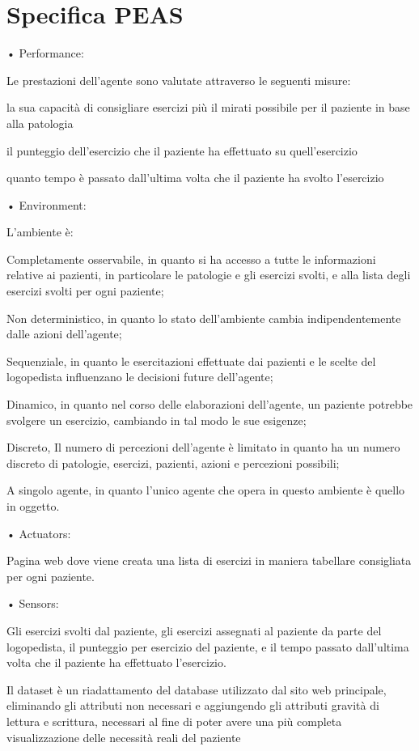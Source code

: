 \documentclass{article}
\begin{document}
    \section{Specifica PEAS}

    • Performance:

    Le prestazioni dell’agente sono valutate attraverso le seguenti misure:

    la sua capacità di consigliare esercizi più il mirati possibile per il paziente in base alla patologia

    il punteggio dell'esercizio che il paziente ha effettuato su quell'esercizio

    quanto tempo è passato dall'ultima volta che il paziente ha svolto l'esercizio

    • Environment:

    L’ambiente è:

    Completamente osservabile, in quanto si ha accesso a tutte le informazioni relative ai pazienti, in particolare le patologie e gli esercizi svolti, e
    alla lista degli esercizi svolti per ogni paziente;

    Non deterministico, in quanto lo stato dell’ambiente cambia indipendentemente dalle azioni dell’agente;

    Sequenziale, in quanto le esercitazioni effettuate dai pazienti e le scelte del logopedista influenzano le decisioni future dell’agente;

    Dinamico, in quanto nel corso delle elaborazioni dell’agente, un paziente potrebbe svolgere un esercizio, cambiando in tal modo le sue esigenze;

    Discreto, Il numero di percezioni dell’agente è limitato in quanto ha un numero discreto di patologie, esercizi, pazienti, azioni e percezioni possibili;

    A singolo agente, in quanto l’unico agente che opera in questo ambiente è quello in oggetto.

    • Actuators:

    Pagina web dove viene creata una lista di esercizi in maniera tabellare consigliata per ogni paziente.

    • Sensors:

    Gli esercizi svolti dal paziente, gli esercizi assegnati al paziente da parte del logopedista, il punteggio per esercizio del paziente, e il tempo passato
    dall'ultima volta che il paziente ha effettuato l'esercizio.

    Il dataset è un riadattamento del database utilizzato dal sito web principale, eliminando gli attributi non necessari e aggiungendo gli attributi gravità
    di lettura e scrittura, necessari al fine di poter avere una più completa visualizzazione delle necessità reali del paziente
\end{document}
